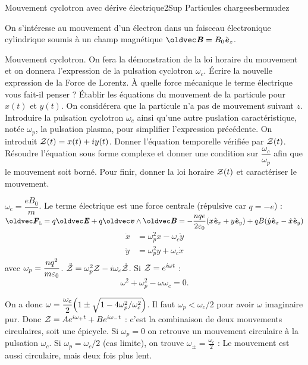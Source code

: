 \begin{exercise}{Mouvement cyclotron avec dérive électrique}{2}{Sup}
{Particules chargees}{bermudez}

On s'intéresse au mouvement d'un électron dans un faisceau électronique cylindrique soumis à un champ magnétique $\vB = B_0\ve_z$.

\begin{questions}
    \questioncours Mouvement cyclotron. On fera la démonstration de la loi horaire du mouvement et on donnera l'expression de la pulsation cyclotron $\omega_c$.
    \question Écrire la nouvelle expression de la Force de Lorentz. \`A quelle force mécanique le terme électrique vous fait-il penser ?
    \question Établir les équations du mouvement de la particule pour $x(t)$ et $y(t)$. On considérera que la particule n'a pas de mouvement suivant $z$.
    \question Introduire la pulsation cyclotron $\omega_c$ ainsi qu'une autre puslation caractéristique, notée $\omega_p$, la pulsation plasma, pour simplifier l'expression précédente.
    \question On introduit $\cal{Z}(t) = x(t) + i y(t)$. Donner l'équation temporelle vérifiée par $\cal{Z}(t)$.
    \question Résoudre l'équation sous forme complexe et donner une condition sur $\dfrac{\omega_c}{\omega_p}$ afin que le mouvement soit borné.
    \question Pour finir, donner la loi horaire $\cal{Z}(t)$ et caractériser le mouvement.
\end{questions}

\end{exercise}

\begin{solution}
    \begin{questions}
        \questioncours $\omega_\text{c} = \dfrac{eB_0}{m}$.
        \question Le terme électrique est une force centrale (répulsive car $q = -e$) : $\vF_\textsc{l} = q\vE + q\vv\wedge\vB = -\dfrac{nqe}{2\ep_0}(x\ve_x + y\ve_y) + q B (\dot{y}\ve_x - \dot{x}\ve_y)$
        \question \begin{align*}
            \ddot{x} &= \omega_p^2x - \omega_c \dot{y} \\
            \ddot{y} &= \omega_p^2y + \omega_c \dot{x}
        \end{align*}
        \question avec $\omega_p = \dfrac{nq^2}{m\ep_0}$.
        \question $\ddot{\cal{Z}} = \omega_p^2\cal{Z} -i\omega_c\dot{\cal{Z}}$.
        \question Si $\cal{Z} = e^{i\omega t}$ :
        $$\omega^2 + \omega_p^2 - \omega \omega_c = 0.$$

        On a donc $\omega = \dfrac{\omega_c}{2}\qty(1 \pm \sqrt{1-4\omega_p^2/\omega_c^2})$. Il faut $\omega_p < \omega_c/2$ pour avoir $\omega$ imaginaire pur.
        \question Donc $\cal{Z} = A e^{i\omega_+ t} + B e^{i\omega_- t}$ : c'est la combinaison de deux mouvements circulaires, soit une épicycle. Si $\omega_p = 0$ on retrouve un mouvement circulaire à la pulsation $\omega_c$. Si $\omega_p = \omega_c/2$ (cas limite), on trouve $\omega_{\pm} = \frac{\omega_c}{2}$ : Le mouvement est aussi circulaire, mais deux fois plus lent.
    \end{questions}
\end{solution}